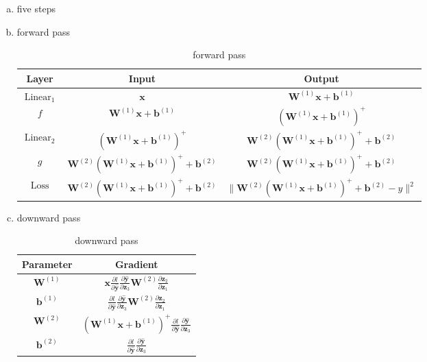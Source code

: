 \documentclass[10pt,a4paper]{article}
\theoremstyle{dotlessP}
\DeclareRobustCommand{\linear}{\operatorname*{Linear}}
\DeclareRobustCommand{\loss}{\operatorname*{Loss}}
\newcommand{\dldy}{\frac{\partial l}{\partial \bm{\hat{y}}}}
\newcommand{\dydz}{\frac{\partial \bm{\hat{y}}}{\partial \bm z_3}}
\begin{document}
\begin{enumerate}[(a)]
	\item  five steps
	\item forward pass
	\begin{table}[tbhp] 
		{\footnotesize
			\caption{ forward pass
			}\label{tab:fw}
			\begin{center}
				\renewcommand{\arraystretch}{1.5}
			\begin{tabular}{|c|c|c|}
				\hline 
				 Layer & Input  & Output \\ 
				\hline 
				$\linear_1$& $\bm x$ & $\bm W^{(1)} \bm x+\bm b^{(1)}$ \\ 
				\hline 
			$f$	&$\bm W^{(1)} \bm x+\bm b^{(1)}$&  $\left(\bm W^{(1)} \bm x+\bm b^{(1)}\right)^+$\\ 
				\hline 
				$\linear_2$& $\left(\bm W^{(1)} \bm x+\bm b^{(1)}\right)^+$ & $\bm W^{(2)}\left(\bm W^{(1)} \bm x+\bm b^{(1)}\right)^+ + \bm b^{(2)}$ \\ 
				\hline 
			$g$	& $\bm W^{(2)}\left(\bm W^{(1)} \bm x+\bm b^{(1)}\right)^+ + \bm b^{(2)}$ &  $\bm W^{(2)}\left(\bm W^{(1)} \bm x+\bm b^{(1)}\right)^+ + \bm b^{(2)}$\\ 
				\hline 
			$\loss$	& $\bm W^{(2)}\left(\bm W^{(1)} \bm x+\bm b^{(1)}\right)^+ + \bm b^{(2)}$ & $\|\bm W^{(2)}\left(\bm W^{(1)} \bm x+\bm b^{(1)}\right)^+ + \bm b^{(2)}-y\|^2$ \\ 
				\hline 
			\end{tabular} 
			\end{center}
		}
	\end{table}

\item downward pass
	\begin{table}[tbhp] 
	{\footnotesize
		\caption{ downward pass
		}\label{tab:dw}
		\begin{center}
			\renewcommand{\arraystretch}{1.8}
	\begin{tabular}{|c|c|}
		\hline 
	Parameter	&  Gradient \\ 
		\hline 
	$\bm W^{(1)}$	& $\bm x\dldy\dydz\bm W^{(2)} \frac{\partial \bm z_2}{\partial \bm z_1}$ \\ 
		\hline 
		$\bm b^{(1)}$&  $\dldy \dydz\bm W^{(2)} \frac{\partial \bm z_2}{\partial \bm z_1}$\\ 
		\hline 
		$\bm W^{(2)}$&  $\left(\bm W^{(1)} \bm x+\bm b^{(1)}\right)^+ \dldy\dydz$\\ 
		\hline 
		$\bm b^{(2)}$& $\dldy\dydz$ \\ 
		\hline 
	\end{tabular} 
		\end{center}
	}
\end{table}


\end{enumerate}
\end{document}
